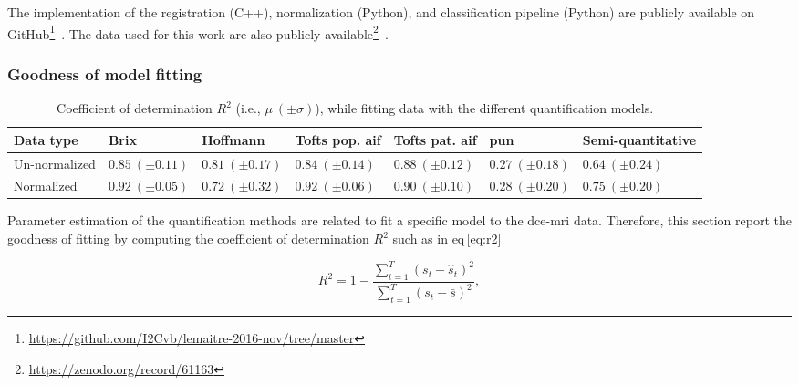 The implementation of the registration (C++), normalization (Python), and classification pipeline (Python) are publicly available on GitHub\footnote{\url{https://github.com/I2Cvb/lemaitre-2016-nov/tree/master}}~\cite{lemaitre2016github}.
The data used for this work are also publicly available\footnote{\url{https://zenodo.org/record/61163}}~\cite{lemaitre2016dce}.



\subsubsection{Goodness of model fitting}\label{subsubsec:chp5:DCE-norm:Good}


\begin{table}
  \caption{Coefficient of determination $R^{2}$ (i.e., $\mu \ (\pm \sigma)$), while fitting data with the different quantification models.}
  \centering
  \scriptsize
  \begin{tabularx}{\textwidth}{lXXXXXX}
    \toprule
    \textbf{Data type} & \textbf{Brix} & \textbf{Hoffmann} & \textbf{Tofts pop. \acs*{aif}} & \textbf{Tofts pat. \acs*{aif}} & \textbf{\acs*{pun}} & \textbf{Semi-quantitative} \\
    \midrule
    Un-normalized & $0.85 \ (\pm 0.11)$ & $0.81 \ (\pm 0.17)$ & $0.84 \ (\pm 0.14)$ & $0.88 \ (\pm 0.12)$ & $0.27 \ (\pm 0.18)$ & $0.64 \ (\pm 0.24)$  \\
    Normalized    & $0.92 \ (\pm 0.05)$ & $0.72 \ (\pm 0.32)$ & $0.92 \ (\pm 0.06)$ & $0.90 \ (\pm 0.10)$ & $0.28 \ (\pm 0.20)$ & $0.75 \ (\pm 0.20)$  \\
    \bottomrule
  \end{tabularx}
  \label{tab:r2}
\end{table}

Parameter estimation of the quantification methods are related to fit a specific model to the \ac{dce}-\ac{mri} data.
Therefore, this section report the goodness of fitting by computing the coefficient of determination $R^2$ such as in \acs{eq}\,\eqref{eq:r2}

\begin{equation}
  R^2 = 1 - \frac{\sum_{t = 1}^{T} (s_t - \hat{s}_t)^2}{\sum_{t = 1}^{T} (s_t - \bar{s})^2} ,
  \label{eq:r2}
\end{equation}

